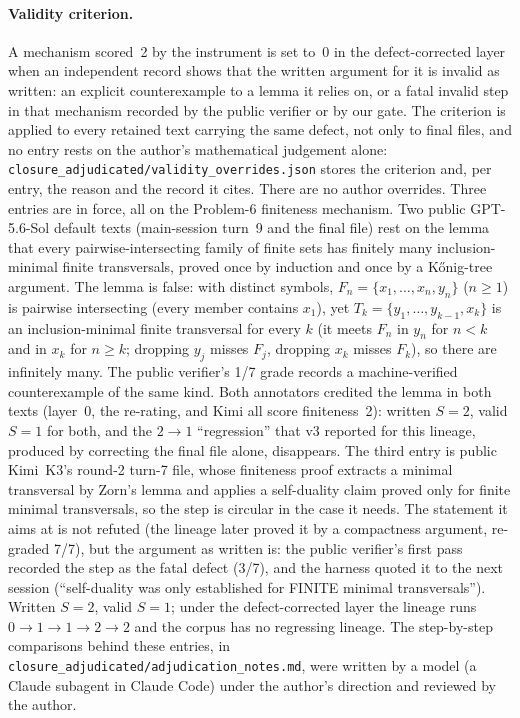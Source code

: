 \paragraph{Validity criterion.} A mechanism scored~2 by the instrument is set to~0 in the defect-corrected layer when an independent record shows that the written argument for it is invalid as written: an explicit counterexample to a lemma it relies on, or a fatal invalid step in that mechanism recorded by the public verifier or by our gate. The criterion is applied to every retained text carrying the same defect, not only to final files, and no entry rests on the author's mathematical judgement alone: \texttt{closure\_adjudicated/\allowbreak validity\_overrides.json} stores the criterion and, per entry, the reason and the record it cites. There are no author overrides. Three entries are in force, all on the Problem-6 finiteness mechanism. Two public GPT-5.6-Sol default texts (main-session turn~9 and the final file) rest on the lemma that every pairwise-intersecting family of finite sets has finitely many inclusion-minimal finite transversals, proved once by induction and once by a K\H{o}nig-tree argument. The lemma is false: with distinct symbols, $F_n=\{x_1,\dots,x_n,y_n\}$ ($n\ge1$) is pairwise intersecting (every member contains $x_1$), yet $T_k=\{y_1,\dots,y_{k-1},x_k\}$ is an inclusion-minimal finite transversal for every $k$ (it meets $F_n$ in $y_n$ for $n<k$ and in $x_k$ for $n\ge k$; dropping $y_j$ misses $F_j$, dropping $x_k$ misses $F_k$), so there are infinitely many. The public verifier's 1/7 grade records a machine-verified counterexample of the same kind. Both annotators credited the lemma in both texts (layer~0, the re-rating, and Kimi all score finiteness~2): written $S{=}2$, valid $S{=}1$ for both, and the $2\to1$ ``regression'' that v3 reported for this lineage, produced by correcting the final file alone, disappears. The third entry is public Kimi~K3's round-2 turn-7 file, whose finiteness proof extracts a minimal transversal by Zorn's lemma and applies a self-duality claim proved only for finite minimal transversals, so the step is circular in the case it needs. The statement it aims at is not refuted (the lineage later proved it by a compactness argument, re-graded 7/7), but the argument as written is: the public verifier's first pass recorded the step as the fatal defect (3/7), and the harness quoted it to the next session (``self-duality was only established for FINITE minimal transversals''). Written $S{=}2$, valid $S{=}1$; under the defect-corrected layer the lineage runs $0\to1\to1\to2\to2$ and the corpus has no regressing lineage. The step-by-step comparisons behind these entries, in \texttt{closure\_adjudicated/\allowbreak adjudication\_notes.md}, were written by a model (a Claude subagent in Claude Code) under the author's direction and reviewed by the author.

